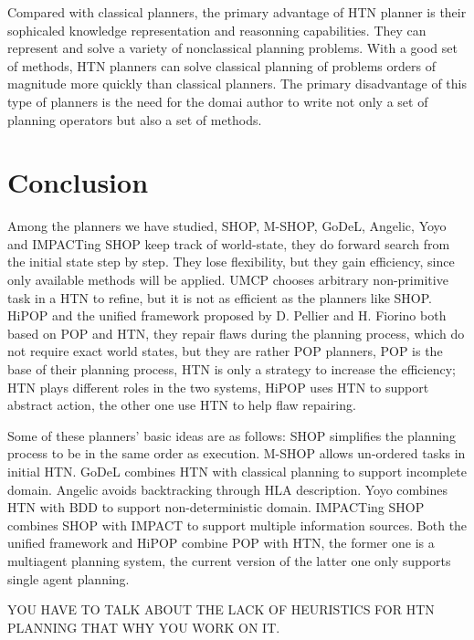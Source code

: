 Compared with classical planners, the primary advantage of HTN planner is their sophicaled knowledge representation and reasonning capabilities. They can represent and solve a variety of nonclassical planning problems. With a good set of methods, HTN planners can solve classical planning of problems orders of magnitude more quickly than classical planners. The primary disadvantage of this type of planners is the need for the domai author to write not only a set of planning operators but also a set of methods.


\section{Conclusion}

Among the planners we have studied, SHOP, M-SHOP, GoDeL, Angelic, Yoyo and IMPACTing SHOP keep track of world-state, they do forward search from the initial state step by step. They lose flexibility, but they gain efficiency, since only available methods will be applied. UMCP chooses arbitrary non-primitive task in a HTN to refine, but it is not as efficient as the planners like SHOP. HiPOP and the unified framework proposed by D. Pellier and H. Fiorino both based on POP and HTN, they repair flaws during the planning process, which do not require exact world states, but they are rather POP planners, POP is the base of their planning process, HTN is only a strategy to increase the efficiency; HTN plays different roles in the two systems, HiPOP uses HTN to support abstract action, the other one use HTN to help flaw repairing.

Some of these planners’ basic ideas are as follows: SHOP simplifies the planning process to be in the same order as execution. M-SHOP allows un-ordered tasks in initial HTN. GoDeL combines HTN with classical planning to support incomplete domain. Angelic avoids backtracking through HLA description. Yoyo combines HTN with BDD to support non-deterministic domain. IMPACTing SHOP combines SHOP with IMPACT to support multiple information sources. Both the unified framework and HiPOP combine POP with HTN, the former one is a multiagent planning system, the current version of the latter one only supports single agent planning.

YOU HAVE TO TALK ABOUT THE LACK OF HEURISTICS FOR HTN PLANNING THAT WHY YOU WORK ON IT.

